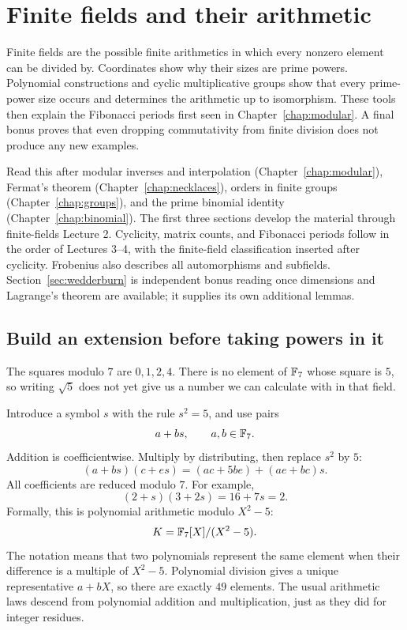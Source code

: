 \chapter{Finite fields and their arithmetic}
\label{app:finite-fields}

\begin{bigidea}
Finite fields are the possible finite arithmetics in which every nonzero
element can be divided by. Coordinates show why their sizes are prime
powers. Polynomial constructions and cyclic multiplicative groups show
that every prime-power size occurs and determines the arithmetic up to
isomorphism. These tools then explain the Fibonacci periods first seen
in Chapter~\ref{chap:modular}. A final bonus proves that even dropping
commutativity from finite division does not produce any new examples.
\end{bigidea}

Read this after modular inverses and interpolation
(Chapter~\ref{chap:modular}), Fermat's theorem
(Chapter~\ref{chap:necklaces}), orders in finite groups
(Chapter~\ref{chap:groups}), and the prime binomial identity
(Chapter~\ref{chap:binomial}). The first three sections develop the
material through finite-fields Lecture 2. Cyclicity, matrix counts, and
Fibonacci periods follow in the order of Lectures 3--4, with the finite-field
classification inserted after cyclicity. Frobenius also describes all
automorphisms and subfields. Section~\ref{sec:wedderburn} is independent
bonus reading once dimensions and Lagrange's theorem are available;
it supplies its own additional lemmas.



\section{Build an extension before taking powers in it}
\label{sec:quadratic-field-arithmetic}

The squares modulo $7$ are $0,1,2,4$. There is no element of $\mathbb F_7$
whose square is $5$, so writing $\sqrt5$ does not yet give us a number
we can calculate with in that field.

Introduce a symbol $s$ with the rule $s^2=5$, and use pairs
\[
 a+bs,\qquad a,b\in\mathbb F_7.
\]
Addition is coefficientwise. Multiply by distributing, then replace
$s^2$ by $5$:
\[
 (a+bs)(c+es)=(ac+5be)+(ae+bc)s.
\]
All coefficients are reduced modulo $7$. For example,
\[
 (2+s)(3+2s)=16+7s=2.
\]
Formally, this is polynomial arithmetic modulo $X^2-5$:
\[
 K=\mathbb F_7[X]/(X^2-5).
\]
The notation means that two polynomials represent the same element when
their difference is a multiple of $X^2-5$. Polynomial division gives a
unique representative $a+bX$, so there are exactly $49$ elements.
The usual arithmetic laws descend from polynomial addition and
multiplication, just as they did for integer residues.

